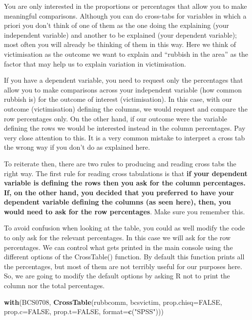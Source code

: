 \documentclass[]{book}
\newenvironment{Shaded}{\begin{snugshade}}{\end{snugshade}}
\newcommand{\DataTypeTok}[1]{\textcolor[rgb]{0.13,0.29,0.53}{#1}}
\newcommand{\KeywordTok}[1]{\textcolor[rgb]{0.13,0.29,0.53}{\textbf{#1}}}
\newcommand{\NormalTok}[1]{#1}
\newcommand{\OtherTok}[1]{\textcolor[rgb]{0.56,0.35,0.01}{#1}}
\newcommand{\StringTok}[1]{\textcolor[rgb]{0.31,0.60,0.02}{#1}}
\theoremstyle{definition}
\theoremstyle{definition}
\theoremstyle{definition}
\theoremstyle{remark}
\begin{document}
You are only interested in the proportions or percentages that allow you
to make meaningful comparisons. Although you can do cross-tabs for
variables in which a priori you don't think of one of them as the one
doing the explaining (your independent variable) and another to be
explained (your dependent variable); most often you will already be
thinking of them in this way. Here we think of victimisation as the
outcome we want to explain and ``rubbish in the area'' as the factor
that may help us to explain variation in victimisation.

If you have a dependent variable, you need to request only the
percentages that allow you to make comparisons across your independent
variable (how common rubbish is) for the outcome of interest
(victimisation). In this case, with our outcome (victimisation) defining
the columns, we would request and compare the row percentages only. On
the other hand, if our outcome were the variable defining the rows we
would be interested instead in the column percentages. Pay very close
attention to this. It is a very common mistake to interpret a cross tab
the wrong way if you don't do as explained here.

To reiterate then, there are two rules to producing and reading cross
tabs the right way. The first rule for reading cross tabulations is that
\textbf{if your dependent variable is defining the rows then you ask for
the column percentages. If, on the other hand, you decided that you
preferred to have your dependent variable defining the columns (as seen
here), then, you would need to ask for the row percentages}. Make sure
you remember this.

To avoid confusion when looking at the table, you could as well modify
the code to only ask for the relevant percentages. In this case we will
ask for the row percentages. We can control what gets printed in the
main console using the different options of the CrossTable() function.
By default this function prints all the percentages, but most of them
are not terribly useful for our purposes here. So, we are going to
modify the default options by asking R not to print the column nor the
total percentages.

\begin{Shaded}
\begin{Highlighting}[]
\KeywordTok{with}\NormalTok{(BCS0708, }\KeywordTok{CrossTable}\NormalTok{(rubbcomm, bcsvictim, }\DataTypeTok{prop.chisq=}\OtherTok{FALSE}\NormalTok{, }\DataTypeTok{prop.c=}\OtherTok{FALSE}\NormalTok{, }\DataTypeTok{prop.t=}\OtherTok{FALSE}\NormalTok{, }\DataTypeTok{format=}\KeywordTok{c}\NormalTok{(}\StringTok{"SPSS"}\NormalTok{)))}
\end{Highlighting}
\end{Shaded}
\end{document}
